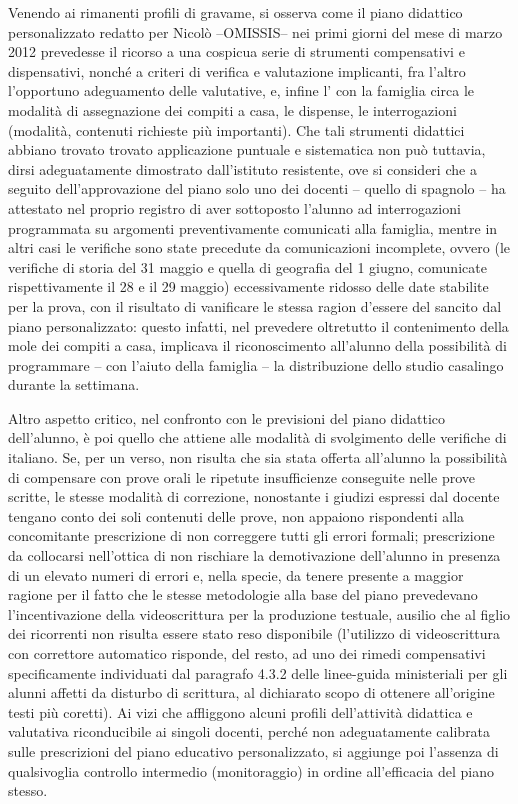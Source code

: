  Venendo ai rimanenti profili di gravame, si osserva come il piano didattico personalizzato redatto per Nicolò --OMISSIS-- nei primi giorni del mese di marzo 2012 prevedesse il ricorso a una cospicua serie di strumenti compensativi e dispensativi, nonché a criteri di verifica e valutazione implicanti, fra l'altro l'opportuno adeguamento delle  valutative, e, infine l' con la famiglia circa le modalità di assegnazione dei compiti a casa, le dispense, le interrogazioni (modalità, contenuti richieste più importanti). Che tali strumenti didattici abbiano trovato trovato applicazione puntuale e sistematica non può tuttavia, dirsi adeguatamente dimostrato dall'istituto resistente, ove si consideri che a seguito dell'approvazione del piano solo uno dei docenti -- quello di spagnolo -- ha attestato nel proprio registro di aver sottoposto l'alunno ad interrogazioni programmata su argomenti preventivamente comunicati alla famiglia, mentre in altri casi le verifiche sono state precedute da comunicazioni incomplete, ovvero (le verifiche di storia del 31 maggio e quella di geografia del 1 giugno, comunicate rispettivamente il 28 e il 29 maggio) eccessivamente ridosso delle date stabilite per la prova, con il risultato di vanificare le stessa ragion d'essere del  sancito dal piano personalizzato: questo infatti, nel prevedere oltretutto il contenimento della mole dei compiti a casa, implicava il riconoscimento all'alunno della possibilità di programmare -- con l'aiuto della famiglia -- la distribuzione dello studio casalingo durante la settimana. 
 
 Altro aspetto critico, nel confronto con le previsioni del piano didattico dell'alunno, è poi quello che attiene alle modalità di svolgimento delle verifiche di italiano. Se, per un verso, non risulta che sia stata offerta all'alunno la possibilità di compensare con prove orali le ripetute insufficienze conseguite nelle prove scritte, le stesse modalità di correzione, nonostante i giudizi espressi dal docente tengano conto dei soli contenuti delle prove, non appaiono rispondenti alla concomitante prescrizione di non correggere tutti gli errori formali; prescrizione da collocarsi nell'ottica di non rischiare la demotivazione dell'alunno in presenza di un elevato numeri di errori e, nella specie, da tenere presente a maggior ragione per il fatto che le stesse metodologie alla base del piano prevedevano l'incentivazione della videoscrittura per la produzione testuale, ausilio che al figlio dei ricorrenti non risulta essere stato reso disponibile (l'utilizzo di videoscrittura con correttore automatico risponde, del resto, ad uno dei rimedi compensativi specificamente individuati dal paragrafo 4.3.2 delle linee-guida ministeriali per gli alunni affetti da disturbo di scrittura, al dichiarato scopo di ottenere all'origine testi più coretti). Ai vizi che affliggono alcuni profili dell'attività didattica e valutativa riconducibile ai singoli docenti, perché non adeguatamente calibrata sulle prescrizioni del piano educativo personalizzato, si aggiunge poi l'assenza di qualsivoglia controllo intermedio (monitoraggio) in ordine all'efficacia del piano stesso.
 
